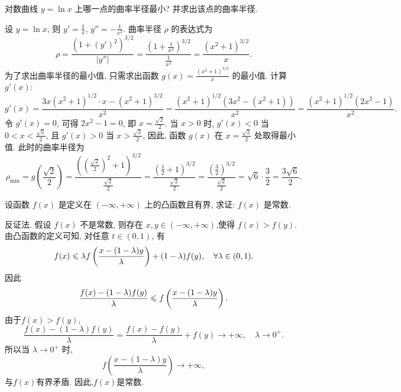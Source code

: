 \begin{exercise}[3.5.13]
    对数曲线 $y = \ln x$ 上哪一点的曲率半径最小? 并求出该点的曲率半径.
\end{exercise}

\begin{solution}
    设 $y = \ln x$, 则 $y' = \frac{1}{x}$, $y'' = -\frac{1}{x^2}$. 曲率半径 $\rho$ 的表达式为
    $$\rho = \frac{(1 + (y')^2)^{3/2}}{|y''|} = \frac{\left(1 + \frac{1}{x^2}\right)^{3/2}}{\frac{1}{x^2}} = \frac{(x^2 + 1)^{3/2}}{x}.$$
    为了求出曲率半径的最小值, 只需求出函数 $g(x) = \frac{(x^2 + 1)^{3/2}}{x}$ 的最小值. 计算 $g'(x)$:
    $$g'(x) = \frac{3x(x^2 + 1)^{1/2} \cdot x - (x^2 + 1)^{3/2}}{x^2} = \frac{(x^2 + 1)^{1/2}(3x^2 - (x^2 + 1))}{x^2} = \frac{(x^2 + 1)^{1/2}(2x^2 - 1)}{x^2}.$$
    令 $g'(x) = 0$, 可得 $2x^2 - 1 = 0$, 即 $x = \frac{\sqrt{2}}{2}$. 当 $x > 0$ 时, $g'(x) < 0$ 当 $0 < x < \frac{\sqrt{2}}{2}$, 且 $g'(x) > 0$ 当 $x > \frac{\sqrt{2}}{2}$, 因此, 函数 $g(x)$ 在 $x = \frac{\sqrt{2}}{2}$ 处取得最小值. 此时的曲率半径为
    $$\rho_{\min} = g\left(\frac{\sqrt{2}}{2}\right) = \frac{\left(\left(\frac{\sqrt{2}}{2}\right)^2 + 1\right)^{3/2}}{\frac{\sqrt{2}}{2}} = \frac{\left(\frac{1}{2} + 1\right)^{3/2}}{\frac{\sqrt{2}}{2}} = \frac{\left(\frac{3}{2}\right)^{3/2}}{\frac{\sqrt{2}}{2}} = \sqrt{6} \cdot \frac{3}{2} = \frac{3\sqrt{6}}{2}.$$
\end{solution}

\begin{exercise}[3.5.14]
    设函数 $f(x)$ 是定义在 $(-\infty, +\infty)$ 上的凸函数且有界, 求证: $f(x)$ 是常数.
\end{exercise}

\begin{solution}
    反证法. 假设 $f(x)$ 不是常数, 则存在 $x,y \in (-\infty, +\infty)$,使得 $f(x) > f(y)$. 由凸函数的定义可知, 对任意 $t \in (0, 1)$, 有
    $$f(x) \leqslant \lambda f\left( \frac{x-(1-\lambda)y}{\lambda} \right) + (1 - \lambda) f(y), \quad \forall \lambda \in (0, 1).$$
    因此$$\frac{f(x) - (1-\lambda)f(y)}{\lambda} \leqslant f\left( \frac{x-(1-\lambda)y}{\lambda} \right).$$
    由于$f(x)>f(y)$,$$\frac{f(x) - (1-\lambda)f(y)}{\lambda} = \frac{f(x) - f(y)}{\lambda} + f(y) \to +\infty, \quad \lambda \to 0^+.$$
    所以当 $\lambda \to 0^+$ 时,$$f\left(\frac{x-(1-\lambda)y}{\lambda}\right) \to +\infty,$$与$f(x)$有界矛盾. 因此,$f(x)$是常数.
\end{solution}

\newpage